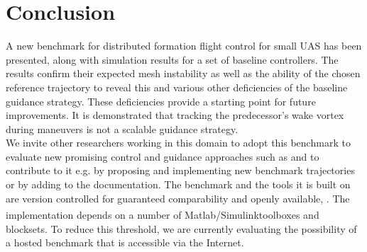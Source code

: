 \documentclass{ifacconf}
\newcommand{\Matlabbrand}{Matlab\textsuperscript{\tiny{\textregistered}}}
\newcommand{\Simulinkbrand}{Simulink\textsuperscript{\tiny{\textregistered}}}
\begin{document}
\section{Conclusion}
\label{sec:conclusio}
A new benchmark for distributed formation flight control for small UAS has been presented, along with simulation results for a set of baseline controllers. The results confirm their expected mesh instability as well as the ability of the chosen reference trajectory to reveal this and various other deficiencies of the baseline guidance strategy. These deficiencies provide a starting point for future improvements. It is demonstrated that tracking the predecessor's wake vortex during maneuvers is not a scalable guidance strategy. \\
We invite other researchers working in this domain to adopt this benchmark to evaluate new promising control and guidance approaches such as \cite{padhi2014formation} and to contribute to it e.g. by proposing and implementing new benchmark trajectories or by adding to the documentation. The benchmark and the tools it is built on are version controlled for guaranteed comparability and openly available, \cite{UAV3D,ffb}. The implementation depends on a number of \Matlabbrand/\Simulinkbrand toolboxes and blocksets. To reduce this threshold, we are currently evaluating the possibility of a hosted benchmark that is accessible via the Internet.
%
      
\end{document}
